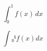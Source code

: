 ﻿\documentclass{article}
\begin{document}
\[
\int_0^1 f(x)\,dx
\]

\[
∫₀¹ f(x) dx
\]
\end{document}
